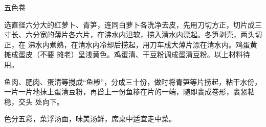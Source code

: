 \begin{recipe}{五色卷}

\ingredients


\preparation

\step 选直径六分大的红萝卜、青笋，连同白萝卜各洗净去皮，先用刀切方正，切片成三
寸长、六分宽的薄片各六片，在沸水内泹软，捞入清水内漂起。冬笋剥壳，两头切正，在
沸水内煮熟，在清水内冷却后捞起，用刀车成大薄片漂在清水内。鸡蛋黄摊成蛋皮（不要
摊老）呈浅黄色。鸡蛋清、干豆粉调成蛋清豆粉。以上材料待用。

\step 鱼肉、肥肉、蛋清等搅成“鱼糁”，分成三十份，做时将青笋等片捞起，粘干水份，
一片一片地抹上蛋清豆粉，再舀上一份鱼糁在片的一端，随即裹成卷形，裹紧粘稳，交头
处向下。

\features

色分五彩，菜浮汤面，味美汤鲜，席桌中适宜走中菜。

\end{recipe}

